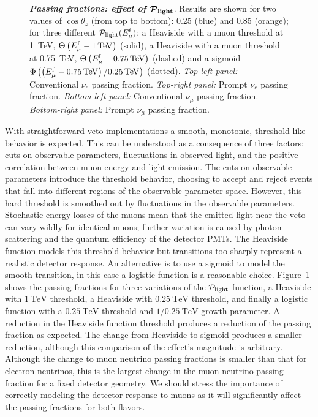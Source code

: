 \begin{figure}[h!]
{	}
	\caption{\textbf{\textit{Passing fractions: effect of $\boldsymbol{{\cal P}_{\rm light}}$}}. Results are shown for two values of $\cos\theta_z$ (from top to bottom): 0.25 (blue) and 0.85 (orange); for three different ${\cal P}_{\rm light}(E_{\mu}^{\rm f})$: a Heaviside with a muon threshold at 1~TeV, $\Theta\left(E_{\mu}^{\rm f} - 1 \, {\rm TeV}\right)$ (solid), a Heaviside with a muon threshold at 0.75~TeV, $\Theta\left(E_{\mu}^{\rm f} - 0.75 \, {\rm TeV}\right)$ (dashed) and a sigmoid $\Phi\left(\left(E_{\mu}^{\rm f} - 0.75 \, {\rm TeV}\right)/0.25 \, {\rm TeV}\right)$ (dotted). \textit{Top-left panel:} Conventional $\nu_e$ passing fraction. \textit{Top-right panel:} Prompt $\nu_e$ passing fraction. \textit{Bottom-left panel:} Conventional $\nu_\mu$ passing fraction. \textit{Bottom-right panel:} Prompt $\nu_\mu$ passing fraction.} \vspace{1.5cm}
	\label{fig:nue-plight-effect}
\end{figure}

With straightforward veto implementations a smooth, monotonic, threshold-like behavior is expected.
This can be understood as a consequence of three factors: cuts on observable parameters, fluctuations in observed light, and the positive correlation between muon energy and light emission.
The cuts on observable parameters introduce the threshold behavior, choosing to accept and reject events that fall into different regions of the observable parameter space.
However, this hard threshold is smoothed out by fluctuations in the observable parameters.
Stochastic energy losses of the muons mean that the emitted light near the veto can vary wildly for identical muons; further variation is caused by photon scattering and the quantum efficiency of the detector PMTs.
The Heaviside function models this threshold behavior but transitions too sharply represent a realistic detector response.
An alternative is to use a sigmoid to model the smooth transition, in this case a logistic function is a reasonable choice.
Figure~\ref{fig:nue-plight-effect} shows the passing fractions for three variations of the ${\cal P}_{\rm light}$ function, a Heaviside with $\SI{1}\TeV$ threshold, a Heaviside with $\SI{0.25}\TeV$ threshold, and finally a logistic function with a $\SI{0.25}\TeV$ threshold and $1/\SI{0.25}\TeV$ growth parameter.
A reduction in the Heaviside function threshold produces a reduction of the passing fraction as expected.
The change from Heaviside to sigmoid produces a smaller reduction, although this comparison of the effect's magnitude is arbitrary.
Although the change to muon neutrino passing fractions is smaller than that for electron neutrinos, this is the largest change in the muon neutrino passing fraction for a fixed detector geometry.
We should stress the importance of correctly modeling the detector response to muons as it will significantly affect the passing fractions for both flavors.

